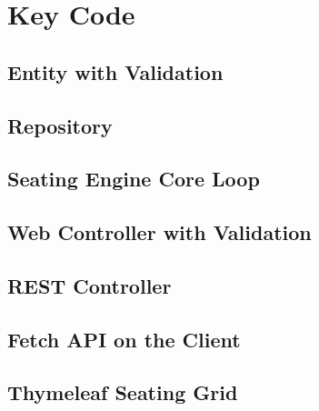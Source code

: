 \documentclass[12pt,a4paper,oneside]{report}
\newcommand{\src}{../../src/main/java/com/examgrid}
\begin{document}
\section{Key Code}
\subsection{Entity with Validation}


\subsection{Repository}


\subsection{Seating Engine Core Loop}


\subsection{Web Controller with Validation}


\subsection{REST Controller}


\subsection{Fetch API on the Client}


\subsection{Thymeleaf Seating Grid}

\end{document}
